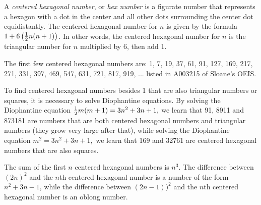 \documentclass[12pt]{article}
\begin{document}
A {\em centered hexagonal number}, or {\em hex number} is a figurate number that represents a hexagon with a dot in the center and all other dots surrounding the center dot equidistantly. The centered hexagonal number for $n$ is given by the formula $1 + 6\left({1 \over 2} n(n + 1 ) \right)$. In other words, the centered hexagonal number for $n$ is the triangular number for $n$ multiplied by 6, then add 1.

The first few centered hexagonal numbers are: 1, 7, 19, 37, 61, 91, 127, 169, 217, 271, 331, 397, 469, 547, 631, 721, 817, 919, ... listed in A003215 of Sloane's OEIS.

To find centered hexagonal numbers besides 1 that are also triangular numbers or squares, it is necessary to solve Diophantine equations. By solving the Diophantine equation ${1 \over 2} m(m + 1) = 3n^2 + 3n + 1,$ we learn that 91, 8911 and 873181 are numbers that are both centered hexagonal numbers and triangular numbers (they grow very large after that), while solving the Diophantine equation $m^2 = 3n^2 + 3n + 1,$ we learn that 169 and 32761 are centered hexagonal numbers that are also squares.

The sum of the first $n$ centered hexagonal numbers is $n^3$. The difference between $(2n)^2$ and the $n$th centered hexagonal number is a number of the form $n^2 + 3n - 1$, while the difference between $(2n - 1))^2$ and the $n$th centered hexagonal number is an oblong number.
\end{document}
